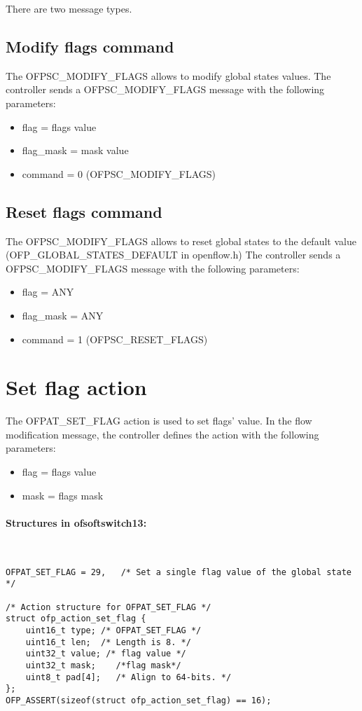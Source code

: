 There are two message types.
\subsection{Modify flags command}
The OFPSC\_MODIFY\_FLAGS allows to modify global states values. The controller sends a OFPSC\_MODIFY\_FLAGS message with the following parameters:
\begin{itemize}
\setlength\itemsep{0em}
\item flag = flags value
\item flag\_mask = mask value
\item command = 0 (OFPSC\_MODIFY\_FLAGS)
\end{itemize}

\subsection{Reset flags command}
The OFPSC\_MODIFY\_FLAGS allows to reset global states to the default value (OFP\_GLOBAL\_STATES\_DEFAULT in openflow.h)
The controller sends a OFPSC\_MODIFY\_FLAGS message with the following parameters:
\begin{itemize}
\setlength\itemsep{0em}
\item flag = ANY
\item flag\_mask = ANY
\item command = 1 (OFPSC\_RESET\_FLAGS)
\end{itemize}

\section{Set flag action}
\label{section:set_flag_action}
The OFPAT\_SET\_FLAG action is used to set flags' value.
In the flow modification message, the controller defines the action with the following parameters:
\begin{itemize}
\setlength\itemsep{0em}
\item flag = flags value
\item mask = flags mask
\end{itemize}

\paragraph{Structures in ofsoftswitch13:}\mbox{}\\
\begin{verbatim}
OFPAT_SET_FLAG = 29,   /* Set a single flag value of the global state */

/* Action structure for OFPAT_SET_FLAG */
struct ofp_action_set_flag {
    uint16_t type; /* OFPAT_SET_FLAG */
    uint16_t len;  /* Length is 8. */
    uint32_t value; /* flag value */
    uint32_t mask;    /*flag mask*/
    uint8_t pad[4];   /* Align to 64-bits. */
};
OFP_ASSERT(sizeof(struct ofp_action_set_flag) == 16);
\end{verbatim}

